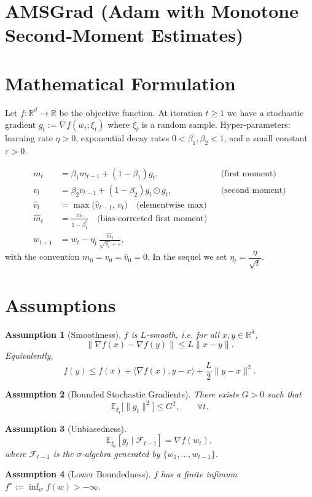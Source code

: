 \documentclass{article}
\newtheorem{assumption}{Assumption}
\begin{document}
\section*{AMSGrad (Adam with Monotone Second‑Moment Estimates)}

\section*{Mathematical Formulation}
Let $f:\mathbb{R}^d\rightarrow\mathbb{R}$ be the objective function.  
At iteration $t\ge 1$ we have a stochastic gradient $g_t:=\nabla f(w_t;\xi_t)$ where $\xi_t$ is a random sample.  
Hyper‑parameters: learning rate $\eta>0$, exponential decay rates $0<\beta_1,\beta_2<1$, and a small constant $\varepsilon>0$.

\[
\begin{aligned}
m_t &= \beta_1 m_{t-1} + (1-\beta_1) g_t, \qquad &&\text{(first moment)}\\[4pt]
v_t &= \beta_2 v_{t-1} + (1-\beta_2) g_t\odot g_t, \qquad &&\text{(second moment)}\\[4pt]
\hat{v}_t &= \max\!\big(\hat{v}_{t-1},\, v_t\big) \quad\text{(elementwise max)}\\[4pt]
\hat{m}_t &= \frac{m_t}{1-\beta_1^{t}}\quad\text{(bias‑corrected first moment)}\\[4pt]
w_{t+1} &= w_t - \eta_t\,\frac{\hat{m}_t}{\sqrt{\hat{v}_t}+\varepsilon},
\end{aligned}
\]
with the convention $m_0=v_0=\hat{v}_0=0$.
In the sequel we set $\eta_t=\dfrac{\eta}{\sqrt{t}}$.

\section*{Assumptions}
\begin{assumption}[Smoothness]\label{ass:smooth}
$f$ is $L$‑smooth, i.e. for all $x,y\in\mathbb{R}^d$,
\[
\|\nabla f(x)-\nabla f(y)\|\le L\|x-y\|.
\]
Equivalently,
\[
f(y)\le f(x)+\langle\nabla f(x),y-x\rangle+\frac{L}{2}\|y-x\|^2 .
\]
\end{assumption}
\begin{assumption}[Bounded Stochastic Gradients]\label{ass:bound}
There exists $G>0$ such that
\[
\mathbb{E}_{\xi_t}\!\big[\|g_t\|^2\big]\le G^2,\qquad\forall t .
\]
\end{assumption}
\begin{assumption}[Unbiasedness]\label{ass:unbiased}
\[
\mathbb{E}_{\xi_t}[g_t\mid \mathcal{F}_{t-1}]=\nabla f(w_t),
\]
where $\mathcal{F}_{t-1}$ is the $\sigma$‑algebra generated by
$\{w_1,\dots,w_{t-1}\}$.
\end{assumption}
\begin{assumption}[Lower Boundedness]\label{ass:lb}
$f$ has a finite infimum $f^\star:=\inf_{w}f(w)>-\infty$.
\end{assumption}
\end{document}

